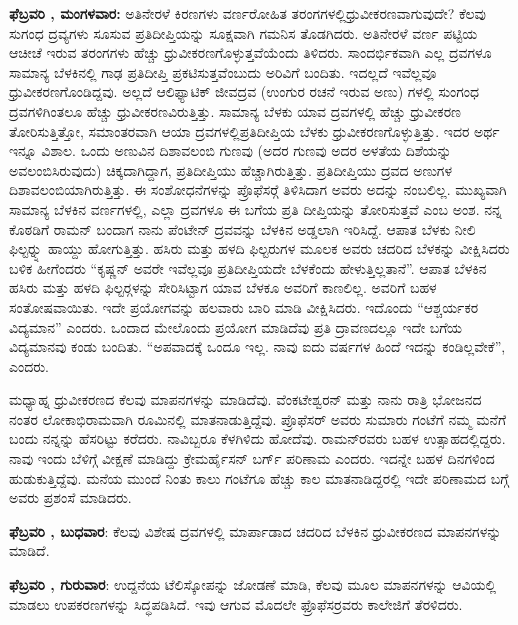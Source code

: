 \textbf{ಫೆಬ್ರವರಿ , ಮಂಗಳವಾರ:} ಅತಿನೇರಳೆ ಕಿರಣಗಳು ವರ್ಣರೋಹಿತ ತರಂಗಗಳಲ್ಲಿ\break ಧ್ರುವೀಕರಣವಾಗುವುದೇ? ಕೆಲವು ಸುಗಂಧ ದ್ರವ್ಯಗಳು ಸೂಸುವ ಪ್ರತಿದೀಪ್ತಿಯನ್ನು ಸೂಕ್ಷವಾಗಿ ಗಮನಿಸ ತೊಡಗಿದರು. ಅತಿನೇರಳೆ ವರ್ಣ ಪಟ್ಟಿಯ ಆಚೀಚೆ ಇರುವ ತರಂಗಗಳು ಹೆಚ್ಚು ಧ್ರುವೀಕರಣಗೊಳ್ಳುತ್ತವೆಯೆಂದು ತಿಳಿದರು. ಸಾಂದರ್ಭಿಕವಾಗಿ ಎಲ್ಲ ದ್ರವಗಳೂ ಸಾಮಾನ್ಯ ಬೆಳಕಿನಲ್ಲಿ ಗಾಢ ಪ್ರತಿದೀಪ್ತಿ ಪ್ರಕಟಿಸುತ್ತವೆಂಬುದು ಅರಿವಿಗೆ ಬಂದಿತು. ಇದಲ್ಲದೆ ಇವೆಲ್ಲವೂ ಧ್ರುವೀಕರಣಗೊಂಡಿದ್ದವು. ಅಲ್ಲದೆ ಆಲಿಫ್ಯಾಟಿಕ್ ಜೀವದ್ರವ (ಉಂಗುರ ರಚನೆ ಇರುವ ಅಣು) ಗಳಲ್ಲಿ ಸುಂಗಂಧ ದ್ರವಗಳಿಗಿಂತಲೂ ಹೆಚ್ಚು ಧ್ರುವೀಕರಣವಿರುತ್ತಿತ್ತು. ಸಾಮಾನ್ಯ ಬೆಳಕು ಯಾವ ದ್ರವಗಳಲ್ಲಿ ಹೆಚ್ಚು ಧ್ರುವೀಕರಣ ತೋರಿಸುತ್ತಿತ್ತೋ, ಸಮಾಂತರವಾಗಿ ಆಯಾ ದ್ರವಗಳಲ್ಲಿ\break ಪ್ರತಿದೀಪ್ತಿಯ ಬೆಳಕು ಧ್ರುವೀಕರಣಗೊಳ್ಳುತ್ತಿತ್ತು. ಇದರ ಅರ್ಥ ಇನ್ನೂ ವಿಶಾಲ. ಒಂದು ಅಣುವಿನ ದಿಶಾವಲಂಬಿ ಗುಣವು (ಅದರ ಗುಣವು ಅದರ ಅಳತೆಯ ದಿಶೆಯನ್ನು ಅವಲಂಬಿಸಿರುವುದು) ಚಿಕ್ಕದಾಗಿದ್ದಾಗ, ಪ್ರತಿದೀಪ್ತಿಯು ಹೆಚ್ಚಾಗಿರುತ್ತಿತ್ತು. ಪ್ರತಿದೀಪ್ತಿಯು ದ್ರವದ ಅಣುಗಳ ದಿಶಾವಲಂಬಿ\-ಯಾಗಿರುತ್ತಿತ್ತು. ಈ ಸಂಶೋಧನೆಗಳನ್ನು ಪ್ರೊಫೆಸರ್‍ಗೆ ತಿಳಿಸಿದಾಗ ಅವರು ಅದನ್ನು ನಂಬಲಿಲ್ಲ. ಮುಖ್ಯವಾಗಿ ಸಾಮಾನ್ಯ ಬೆಳಕಿನ ವರ್ಣಗಳಲ್ಲಿ, ಎಲ್ಲಾ ದ್ರವಗಳೂ ಈ ಬಗೆಯ ಪ್ರತಿ ದೀಪ್ತಿಯನ್ನು ತೋರಿಸುತ್ತವೆ ಎಂಬ ಅಂಶ. ನನ್ನ ಕೊಠಡಿಗೆ ರಾಮನ್ ಬಂದಾಗ ನಾನು ಪೆಂಟೇನ್ ದ್ರವವನ್ನು ಬೆಳಕಿನ ಅಡ್ಡಲಾಗಿ ಇರಿಸಿದ್ದೆ. ಆಪಾತ ಬೆಳಕು ನೀಲಿ ಫಿಲ್ಟರ್‍ನ್ನು ಹಾಯ್ದು ಹೋಗುತ್ತಿತ್ತು. ಹಸಿರು ಮತ್ತು ಹಳದಿ ಫಿಲ್ಟರುಗಳ ಮೂಲಕ ಅವರು ಚದರಿದ ಬೆಳಕನ್ನು ವೀಕ್ಷಿಸಿದರು ಬಳಿಕ ಹೀಗೆಂದರು\enginline{-} “ಕೃಷ್ಣನ್ ಅವರೇ ಇವೆಲ್ಲವೂ ಪ್ರತಿದೀಪ್ತಿಯದೇ ಬೆಳಕೆಂದು ಹೇಳುತ್ತಿಲ್ಲತಾನೆ”. ಆಪಾತ ಬೆಳಕಿನ ಹಸಿರು ಮತ್ತು ಹಳದಿ ಫಿಲ್ಟರ್‍ಗಳನ್ನು ಸೇರಿಸಿಟ್ಟಾಗ ಯಾವ ಬೆಳಕೂ ಅವರಿಗೆ ಕಾಣಲಿಲ್ಲ. ಅವರಿಗೆ ಬಹಳ ಸಂತೋಷವಾಯಿತು. ಇದೇ ಪ್ರಯೋಗವನ್ನು ಹಲವಾರು ಬಾರಿ ಮಾಡಿ ವೀಕ್ಷಿಸಿದರು. ಇದೊಂದು “ಆಶ್ಚರ್ಯಕರ ವಿದ್ಯಮಾನ” ಎಂದರು. ಒಂದಾದ ಮೇಲೊಂದು ಪ್ರಯೋಗ ಮಾಡಿದೆವು ಪ್ರತಿ ದ್ರಾವಣದಲ್ಲೂ ಇದೇ ಬಗೆಯ ವಿದ್ಯಮಾನವು ಕಂಡು ಬಂದಿತು. “ಅಪವಾದಕ್ಕೆ ಒಂದೂ ಇಲ್ಲ. ನಾವು ಐದು ವರ್ಷಗಳ ಹಿಂದೆ ಇದನ್ನು ಕಂಡಿಲ್ಲವೇಕೆ”, ಎಂದರು.

ಮಧ್ಯಾಹ್ನ ಧ್ರುವೀಕರಣದ ಕೆಲವು ಮಾಪನಗಳನ್ನು ಮಾಡಿದೆವು. ವೆಂಕಟೇಶ್ವರನ್ ಮತ್ತು ನಾನು ರಾತ್ರಿ ಭೋಜನದ ನಂತರ ಲೋಕಾಭಿರಾಮವಾಗಿ ರೂಮಿನಲ್ಲಿ ಮಾತನಾಡುತ್ತಿದ್ದೆವು. ಪ್ರೊಫೆಸರ್ ಅವರು ಸುಮಾರು  ಗಂಟೆಗೆ ನಮ್ಮ ಮನೆಗೆ ಬಂದು ನನ್ನನ್ನು ಹೆಸರಿಟ್ಟು ಕರೆದರು. ನಾವಿಬ್ಬರೂ ಕೆಳಗಿಳಿದು ಹೋದೆವು. ರಾಮನ್‍ರವರು ಬಹಳ ಉತ್ಸಾಹದಲ್ಲಿದ್ದರು. ನಾವು ಇಂದು ಬೆಳಿಗ್ಗೆ ವೀಕ್ಷಣೆ ಮಾಡಿದ್ದು ಕ್ರೇಮರ್\enginline{-}ಹೈಸನ್ ಬರ್ಗ್ ಪರಿಣಾಮ ಎಂದರು. ಇದನ್ನೇ ಬಹಳ ದಿನಗಳಿಂದ ಹುಡುಕುತ್ತಿದ್ದೆವು. ಮನೆಯ ಮುಂದೆ ನಿಂತು ಕಾಲು ಗಂಟೆಗೂ ಹೆಚ್ಚು ಕಾಲ ಮಾತನಾಡಿದ್ದರಲ್ಲಿ ಇದೇ ಪರಿಣಾಮದ ಬಗ್ಗೆ ಅವರು ಪ್ರಶಂಸೆ ಮಾಡಿದರು.

\textbf{ಫೆಬ್ರವರಿ , ಬುಧವಾರ}: ಕೆಲವು ವಿಶೇಷ ದ್ರವಗಳಲ್ಲಿ ಮಾರ್ಪಾಡಾದ ಚದರಿದ ಬೆಳಕಿನ ಧ್ರುವೀಕರಣದ ಮಾಪನಗಳನ್ನು ಮಾಡಿದೆ.

\textbf{ಫೆಬ್ರವರಿ , ಗುರುವಾರ}: ಉದ್ದನೆಯ ಟೆಲಿಸ್ಕೋಪನ್ನು ಜೋಡಣೆ ಮಾಡಿ, ಕೆಲವು ಮೂಲ ಮಾಪನಗಳನ್ನು ಆವಿಯಲ್ಲಿ ಮಾಡಲು ಉಪಕರಣಗಳನ್ನು ಸಿದ್ಧಪಡಿಸಿದೆ. ಇವು ಆಗುವ ಮೊದಲೇ ಫ್ರೊಫೆಸರ್‍ರವರು ಕಾಲೇಜಿಗೆ ತೆರಳಿದರು.

